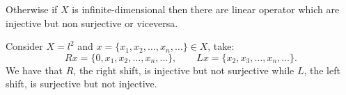 Otherwise if $X$ is infinite-dimensional then there are linear operator which are injective but non surjective or viceversa.
\begin{exam}
		Consider $X=l^2$ and $x= \{x_1,x_2,\ldots,x_n,\ldots\} \in X$, take:
		$$
		Rx = \{0, x_1, x_2, \ldots, x_n, \ldots\}, \qquad Lx = \{x_2,x_3, \ldots, x_n, \ldots\}.
		$$
		We have that $R$, the right shift, is injective but not surjective while $L$, the left shift, is surjective but not injective.
\end{exam}

%
%	
%	
%	
%
%
%
%
